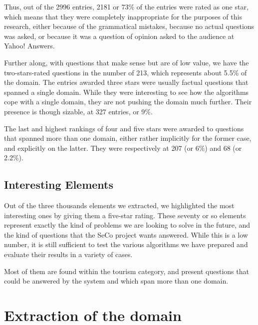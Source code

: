 Thus, out of the 2996 entries, 2181 or 73\% of the entries were rated as one star, which means that they were completely inappropriate for the purposes of this research, either because of the grammatical mistakes, because no actual questions was asked, or because it was a question of opinion asked to the audience at Yahoo! Answers.

Further along, with questions that make sense but are of low value, we have the two-stars-rated questions in the number of 213, which represents about 5.5\% of the domain. The entries awarded three stars were usually factual questions that spanned a single domain. While they were interesting to see how the algorithms cope with a single domain, they are not pushing the domain much further. Their presence is though sizable, at 327 entries, or 9\%.

The last and highest rankings of four and five stars were awarded to questions that spanned more than one domain, either rather implicitly for the former case, and explicitly on the latter. They were respectively at 207 (or 6\%) and 68 (or 2.2\%).


\subsection{Interesting Elements} %
\label{sub:interesting_elements}

Out of the three thousands elements we extracted, we highlighted the most interesting ones by giving them a five-star rating. These seventy or so elements represent exactly the kind of problems we are looking to solve in the future, and the kind of questions that the SeCo project wants answered. While this is a low number, it is still sufficient to test the various algorithms we have prepared and evaluate their results in a variety of cases.

Most of them are found within the tourism category, and present questions that could be answered by the system and which span more than one domain.



\section{Extraction of the domain} %
\label{sec:extraction_of_the_domain}

